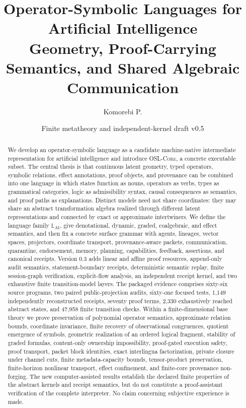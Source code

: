 \documentclass[11pt]{article}
\title{\textbf{Operator-Symbolic Languages for Artificial Intelligence}\\[0.35em]
\large Geometry, Proof-Carrying Semantics, and Shared Algebraic Communication}
\author{Komorebi P.}
\date{Finite metatheory and independent-kernel draft v0.5}
\theoremstyle{definition}
\theoremstyle{remark}
\newcommand{\LangAI}{\mathbb L_{\mathrm{AI}}}
\newcommand{\OSLCore}{\textnormal{\textsc{OSL-Core}}\xspace}
\begin{document}
\maketitle

\begin{abstract}
We develop an operator-symbolic language as a candidate machine-native intermediate representation for artificial intelligence and introduce \OSLCore, a concrete executable subset. The central thesis is that continuous latent geometry, typed operators, symbolic relations, effect annotations, proof objects, and provenance can be combined into one language in which states function as nouns, operators as verbs, types as grammatical categories, logic as admissibility syntax, causal consequences as semantics, and proof paths as explanations. Distinct models need not share coordinates: they may share an abstract transformation algebra realized through different latent representations and connected by exact or approximate intertwiners. We define the language family \(\LangAI\), give denotational, dynamic, graded, coalgebraic, and effect semantics, and then fix a concrete surface grammar with agents, lineages, vector spaces, projectors, coordinate transport, provenance-aware packets, communication, quarantine, endorsement, memory, planning, capabilities, feedback, assertions, and canonical receipts. Version 0.3 adds linear and affine proof resources, append-only audit semantics, statement-boundary receipts, deterministic semantic replay, finite session-graph verification, explicit-flow analysis, an independent receipt kernel, and two exhaustive finite transition-model layers. The packaged evidence comprises sixty-six source programs, two paired public-projection audits, sixty-one focused tests, 1,149 independently reconstructed receipts, seventy proof terms, 2,330 exhaustively reached abstract states, and 47,958 finite transition checks. Within a finite-dimensional base theory we prove preservation of polynomial operator semantics, approximate relation bounds, coordinate invariance, finite recovery of observational congruences, quotient emergence of symbols, geometric realization of an ordered logical fragment, stability of graded formulas, content-only ownership impossibility, proof-gated execution safety, proof transport, packet block identities, exact interlingua factorization, private closure under channel cuts, finite metadata-capacity bounds, tensor-product preservation, finite-horizon nonlinear transport, effect confinement, and finite-core provenance non-forging. The new computer-assisted results establish the declared finite properties of the abstract kernels and receipt semantics, but do not constitute a proof-assistant verification of the complete interpreter. No claim concerning subjective experience is made.
\end{abstract}
\end{document}

